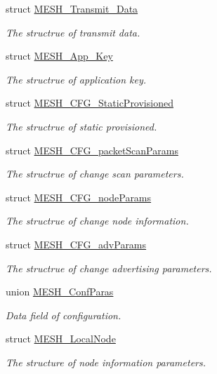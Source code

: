 \begin{DoxyCompactItemize}
struct \hyperlink{struct_m_e_s_h___transmit___data}{M\+E\+S\+H\+\_\+\+Transmit\+\_\+\+Data}
\begin{DoxyCompactList}\small\item\em The structrue of transmit data. \end{DoxyCompactList}\item 
struct \hyperlink{struct_m_e_s_h___app___key}{M\+E\+S\+H\+\_\+\+App\+\_\+\+Key}
\begin{DoxyCompactList}\small\item\em The structrue of application key. \end{DoxyCompactList}\item 
struct \hyperlink{struct_m_e_s_h___c_f_g___static_provisioned}{M\+E\+S\+H\+\_\+\+C\+F\+G\+\_\+\+Static\+Provisioned}
\begin{DoxyCompactList}\small\item\em The structrue of static provisioned. \end{DoxyCompactList}\item 
struct \hyperlink{struct_m_e_s_h___c_f_g__packet_scan_params}{M\+E\+S\+H\+\_\+\+C\+F\+G\+\_\+packet\+Scan\+Params}
\begin{DoxyCompactList}\small\item\em The structrue of change scan parameters. \end{DoxyCompactList}\item 
struct \hyperlink{struct_m_e_s_h___c_f_g__node_params}{M\+E\+S\+H\+\_\+\+C\+F\+G\+\_\+node\+Params}
\begin{DoxyCompactList}\small\item\em The structrue of change node information. \end{DoxyCompactList}\item 
struct \hyperlink{struct_m_e_s_h___c_f_g__adv_params}{M\+E\+S\+H\+\_\+\+C\+F\+G\+\_\+adv\+Params}
\begin{DoxyCompactList}\small\item\em The structrue of change advertising parameters. \end{DoxyCompactList}\item 
union \hyperlink{union_m_e_s_h___conf_paras}{M\+E\+S\+H\+\_\+\+Conf\+Paras}
\begin{DoxyCompactList}\small\item\em Data field of configuration. \end{DoxyCompactList}\item 
struct \hyperlink{struct_m_e_s_h___local_node}{M\+E\+S\+H\+\_\+\+Local\+Node}
\begin{DoxyCompactList}\small\item\em The structure of node information parameters. \end{DoxyCompactList}\end{DoxyCompactItemize}
